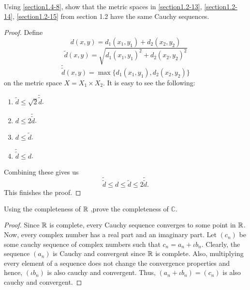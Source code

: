  \begin{question}
     Using \ref{section1.4-8}, show that the metric spaces in \ref{section1.2-13}, \ref{section1.2-14}, \ref{section1.2-15} from section 1.2 have the same Cauchy sequences.
     \label{section1.4-9}
 \end{question}
 \begin{proof}
     Define 
     \[d(x,y) = d_1(x_1,y_1) + d_2(x_2,y_2)\]
     \[\tilde{d}(x,y) = \sqrt{d_1(x_1,y_1)^2 + d_2(x_2 , y_2)^2}\]
     \[\tilde{\tilde{d}}(x,y) = \max\{d_1(x_1,y_1) , d_2(x_2,y_2)\}\]
     on the metric space $X = X_1 \times X_2$.
     It is easy to see the following:
     \begin{enumerate}
         \item $\tilde{d} \leq \sqrt{2} \tilde{\tilde{d}}$.
         \item $d \leq 2 \tilde{\tilde{d}}$.
         \item $d \leq \tilde{d}$.
         \item $\tilde{\tilde{d}} \leq d$.
     \end{enumerate}
     Combining these gives us
     \[\tilde{\tilde{d}} \leq d \leq \tilde{d} \leq 2\tilde{\tilde{d}}.\]
     This finishes the proof.
 \end{proof}

 \begin{question}
     Using the completeness of $\mathbb{R}$ ,prove the completeness of $\mathbb{C}.$
     \label{section1.4-10}
 \end{question}
 \begin{proof}
     Since $\mathbb{R}$ is complete, every Cauchy sequence converges to some point in $\mathbb{R}$. Now, every complex number has a real part and an imaginary part. Let $(c_n)$ be some cauchy sequence of complex numbers such that $c_n = a_n + \iota b_n$. Clearly, the sequence $(a_n)$ is Cauchy and convergent since $\mathbb{R}$ is complete. Also, multiplying every element of a sequence does not change the convergence properties and hence, $(\iota b_n)$ is also cauchy and convergent. Thus, $(a_n + \iota b_n) = (c_n)$ is also cauchy and convergent.
 \end{proof}